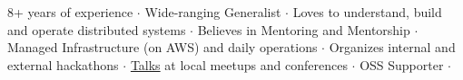 

\begin{cvparagraph}
8+ years of experience ${\cdotp}$ Wide-ranging Generalist ${\cdotp}$ Loves to understand, build and operate distributed systems ${\cdotp}$ Believes in Mentoring and Mentorship ${\cdotp}$ Managed Infrastructure (on AWS) and daily operations ${\cdotp}$ Organizes internal and external hackathons ${\cdotp}$ \href{https://github.com/ashwanthkumar/talks}{Talks} at local meetups and conferences ${\cdotp}$ OSS Supporter ${\cdotp}$
\end{cvparagraph}
